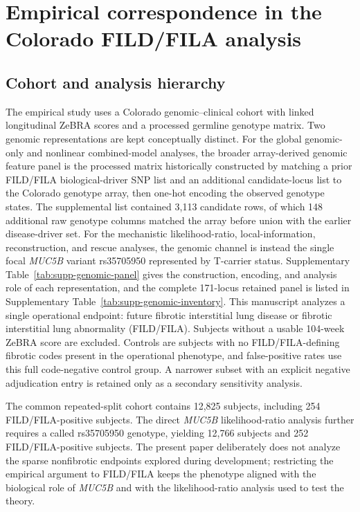 \section{Empirical correspondence in the Colorado FILD/FILA analysis}
\label{sec:empirical}

\subsection{Cohort and analysis hierarchy}
The empirical study uses a Colorado genomic--clinical cohort with linked longitudinal ZeBRA scores and a processed germline genotype matrix. Two genomic representations are kept conceptually distinct. For the global genomic-only and nonlinear combined-model analyses, the broader array-derived genomic feature panel is the processed matrix historically constructed by matching a prior FILD/FILA biological-driver SNP list and an additional candidate-locus list to the Colorado genotype array, then one-hot encoding the observed genotype states. The supplemental list contained 3,113 candidate rows, of which 148 additional raw genotype columns matched the array before union with the earlier disease-driver set. For the mechanistic likelihood-ratio, local-information, reconstruction, and rescue analyses, the genomic channel is instead the single focal \textit{MUC5B} variant rs35705950 represented by T-carrier status. Supplementary Table~\ref{tab:supp-genomic-panel} gives the construction, encoding, and analysis role of each representation, and the complete 171-locus retained panel is listed in Supplementary Table~\ref{tab:supp-genomic-inventory}. This manuscript analyzes a single operational endpoint: future fibrotic interstitial lung disease or fibrotic interstitial lung abnormality (FILD/FILA). Subjects without a usable 104-week ZeBRA score are excluded. Controls are subjects with no FILD/FILA-defining fibrotic codes present in the operational phenotype, and false-positive rates use this full code-negative control group. A narrower subset with an explicit negative adjudication entry is retained only as a secondary sensitivity analysis.

The common repeated-split cohort contains 12,825 subjects, including 254 FILD/FILA-positive subjects. The direct \textit{MUC5B} likelihood-ratio analysis further requires a called rs35705950 genotype, yielding 12,766 subjects and 252 FILD/FILA-positive subjects. The present paper deliberately does not analyze the sparse nonfibrotic endpoints explored during development; restricting the empirical argument to FILD/FILA keeps the phenotype aligned with the biological role of \textit{MUC5B} and with the likelihood-ratio analysis used to test the theory.

